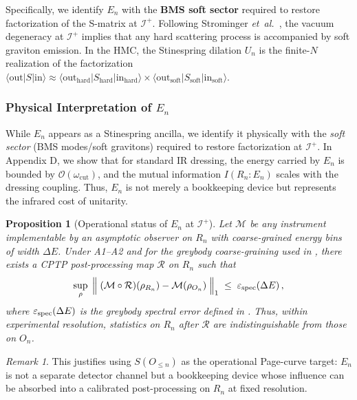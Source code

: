 \documentclass[aps,prd,preprint,onecolumn,superscriptaddress,nofootinbib,longbibliography,floatfix,11pt,showpacs,showkeys]{revtex4-2}
\newcommand{\etal}{\textit{et~al.}\xspace}
\theoremstyle{plain}
\newtheorem{proposition}[theorem]{Proposition}
\theoremstyle{definition}
\theoremstyle{remark}
\newtheorem{remark}[theorem]{Remark}
\begin{document}
Specifically, we identify $E_n$ with the \textbf{BMS soft sector} required to restore factorization of the S-matrix at $\mathscr{I}^+$.
Following Strominger \etal~\cite{HPS:2016}, the vacuum degeneracy at $\mathscr{I}^+$ implies that any hard scattering process is accompanied by soft graviton emission. In the HMC, the Stinespring dilation $U_n$ is the finite-$N$ realization of the factorization $\langle \text{out} | S | \text{in} \rangle \approx \langle \text{out}_{\text{hard}} | S_{\text{hard}} | \text{in}_{\text{hard}} \rangle \times \langle \text{out}_{\text{soft}} | S_{\text{soft}} | \text{in}_{\text{soft}} \rangle$.

\subsubsection{Physical Interpretation of $E_n$}
While $E_n$ appears as a Stinespring ancilla, we identify it physically with the \emph{soft sector} (BMS modes/soft gravitons) required to restore factorization at $\mathscr{I}^+$.
In Appendix D, we show that for standard IR dressing, the energy carried by $E_n$ is bounded by $\mathcal{O}(\omega_{\text{cut}})$, and the mutual information $I(R_n:E_n)$ scales with the dressing coupling.
Thus, $E_n$ is not merely a bookkeeping device but represents the infrared cost of unitarity.

\begin{proposition}[Operational status of $E_n$ at $\mathscr{I}^+$]\label{prop:En-operational}
Let $\mathcal{M}$ be any instrument implementable by an asymptotic observer on $R_n$ with coarse-grained energy bins of width $\Delta E$. Under A1--A2 and for the greybody coarse-graining used in , there exists a CPTP post-processing map $\mathcal{R}$ on $R_n$ such that
\begin{equation*}
\sup_{\rho}\;\Big\|\; (\mathcal{M}\circ\mathcal{R})(\rho_{R_n}) - \mathcal{M}(\rho_{O_n}) \;\Big\|_1 \;\le\; \varepsilon_{\rm spec}(\Delta E)\,,
\end{equation*}
where $\varepsilon_{\rm spec}(\Delta E)$ is the greybody spectral error defined in . Thus, within experimental resolution, statistics on $R_n$ after $\mathcal{R}$ are indistinguishable from those on $O_n$.
\end{proposition}
\begin{remark}
This justifies using $S(O_{\le n})$ as the operational Page-curve target: $E_n$ is not a separate detector channel but a bookkeeping device whose influence can be absorbed into a calibrated post-processing on $R_n$ at fixed resolution.
\end{remark}
\end{document}
